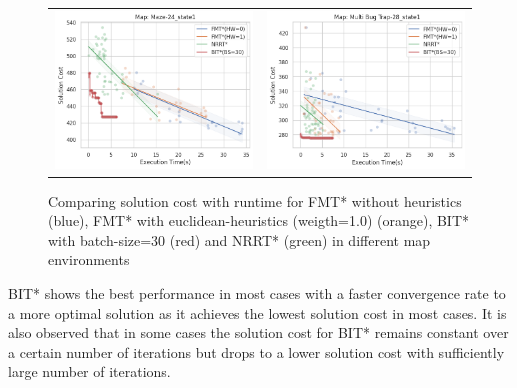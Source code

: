 \documentclass{article}
\begin{document}
\begin{figure}
{\begin{tabular}{cc}
			\includegraphics[scale=0.45]{scVet_Maze-24_state1.png} & \includegraphics[scale=0.45]{scVet_Multi Bug Trap-28_state1.png}  \\
		\end{tabular}
	}
	\caption{Comparing solution cost with runtime for FMT* without heuristics (blue), FMT* with euclidean-heuristics (weigth=1.0) (orange), BIT* with batch-size=30 (red) and NRRT* (green) in different map environments}
        \label{met:scVet}
\end{figure}

BIT* shows the best performance in most cases with a faster convergence rate to a more optimal solution as it achieves the lowest solution cost in most cases. It is also observed that in some cases the solution cost for BIT* remains constant over a certain number of iterations but drops to a lower solution cost with sufficiently large number of iterations. 
\end{document}
